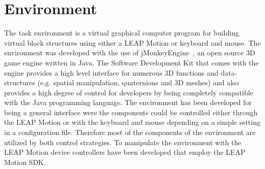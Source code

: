 \section{Environment}

The task environment is a virtual graphical computer program for building virtual block structures using either a LEAP Motion or keyboard and mouse. The environment was developed with the use of jMonkeyEngine~\cite{Irene:2012}, an open source 3D game engine written in Java. The Software Development Kit that comes with the engine provides a high level interface for numerous 3D functions and data-structures (e.g. spatial manipulation, quaternions and 3D meshes) and also provides a high degree of control for developers by being completely compatible with the Java programming language. The environment has been developed for being a general interface were the components could be controlled either through the LEAP Motion or with the keyboard and mouse depending on a simple setting in a configuration file. Therefore most of the components of the environment are utilized by both control strategies. To manipulate the environment with the LEAP Motion device controllers have been developed that employ the LEAP Motion SDK.



